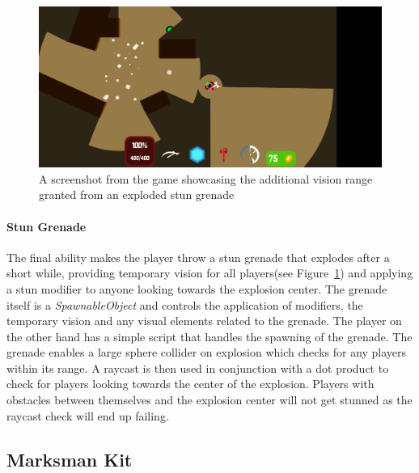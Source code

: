 \begin{figure}[tbph]  %
  \centering
  \includegraphics[width=\textwidth]{images/stunGrenade}
  \caption[Screenshot of the brawler kit's stun grenade]{A screenshot from the game showcasing the additional vision range granted from an exploded stun grenade}
  \label{fig:brawlerStunGrenade}
\end{figure}

\paragraph{Stun Grenade}
The final ability makes the player throw a stun grenade that explodes after a short while, providing temporary vision for all players(see Figure~\ref{fig:brawlerStunGrenade}) and applying a stun modifier to anyone looking towards the explosion center. The grenade itself is a \emph{SpawnableObject} and controls the application of modifiers, the temporary vision and any visual elements related to the grenade. The player on the other hand has a simple script that handles the spawning of the grenade. The grenade enables a large sphere collider on explosion which checks for any players within its range. A raycast is then used in conjunction with a dot product to check for players looking towards the center of the explosion. Players with obstacles between themselves and the explosion center will not get stunned as the raycast check will end up failing. 

\subsection{Marksman Kit}


